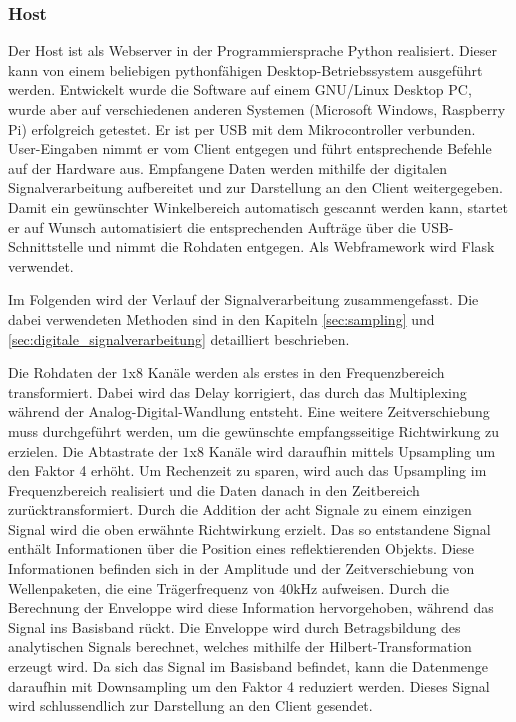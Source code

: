 \subsubsection{Host}\label{sec:host}
Der Host ist als Webserver in der Programmiersprache Python realisiert. Dieser kann von einem beliebigen pythonfähigen Desktop-Betriebssystem ausgeführt werden. Entwickelt wurde die Software auf einem GNU/Linux Desktop PC, wurde aber auf verschiedenen anderen Systemen (Microsoft Windows, Raspberry Pi) erfolgreich getestet. Er ist per USB mit dem Mikrocontroller verbunden. User-Eingaben nimmt er vom Client entgegen und führt entsprechende Befehle auf der Hardware aus. Empfangene Daten werden mithilfe der digitalen Signalverarbeitung aufbereitet und zur Darstellung an den Client weitergegeben.
Damit ein gewünschter Winkelbereich automatisch gescannt werden kann, startet er auf Wunsch automatisiert die entsprechenden Aufträge über die USB-Schnittstelle und nimmt die Rohdaten entgegen. Als Webframework wird Flask verwendet.

Im Folgenden wird der Verlauf der Signalverarbeitung zusammengefasst. Die dabei verwendeten Methoden sind in den Kapiteln \ref{sec:sampling}  und \ref{sec:digitale_signalverarbeitung} detailliert beschrieben.

Die Rohdaten der $1$x$8$ Kanäle werden als erstes in den Frequenzbereich transformiert. Dabei wird das Delay korrigiert, das durch das Multiplexing während der Analog-Digital-Wandlung entsteht. Eine weitere Zeitverschiebung muss durchgeführt werden, um die gewünschte empfangsseitige Richtwirkung zu erzielen. Die Abtastrate der $1$x$8$ Kanäle wird daraufhin mittels Upsampling um den Faktor 4 erhöht. Um Rechenzeit zu sparen, wird auch das Upsampling im Frequenzbereich realisiert und die Daten danach in den Zeitbereich zurücktransformiert.
Durch die Addition der acht Signale zu einem einzigen Signal wird die oben erwähnte Richtwirkung erzielt.
Das so entstandene Signal enthält Informationen über die Position eines reflektierenden Objekts. Diese Informationen befinden sich in der Amplitude und der Zeitverschiebung von Wellenpaketen, die eine Trägerfrequenz von $40 \mathrm{kHz}$ aufweisen.
Durch die Berechnung der Enveloppe wird diese Information hervorgehoben, während das Signal ins Basisband rückt. Die Enveloppe wird durch Betragsbildung des analytischen Signals berechnet, welches mithilfe der Hilbert-Transformation erzeugt wird. Da sich das Signal im Basisband befindet, kann die Datenmenge daraufhin mit Downsampling um den Faktor 4 reduziert werden. Dieses Signal wird schlussendlich zur Darstellung an den Client gesendet.

